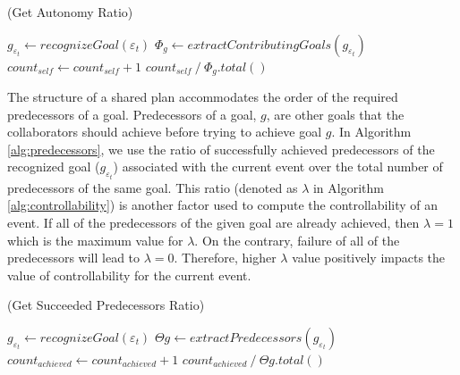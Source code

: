 \documentclass{aamas2016}
\begin{document}
\begin{algorithm}
	\caption{(Get Autonomy Ratio)}
	\label{alg:autonomy}
	\begin{algorithmic}[1]
			\Statex
			\State $\mathit{g}_{\varepsilon_t} \gets \textit{recognizeGoal}{(\varepsilon_t)}$
			\Statex
				\State {}
			\EndIf
			\Statex
			\State $\Phi_{\mathit{g}} \gets
			\textit{extractContributingGoals}{(\mathit{g}_{\varepsilon_t})}$
			\Statex
					\State $count_{self} \gets count_{self} + 1$
				\EndIf
			\EndFor
			\Statex
			\State \Return 
			${count_{self} \mathbin{/} {{\Phi_{\mathit{g}}}.total()}}$
		\EndFunction 
	\end{algorithmic}
\end{algorithm}

The structure of a shared plan accommodates the order of the required
predecessors of a goal. Predecessors of a goal, $g$, are other goals that
the collaborators should achieve before trying to achieve goal $g$. In Algorithm
\ref{alg:predecessors}, we use the ratio of successfully achieved predecessors
of the recognized goal ($\mathit{g}_{\varepsilon_t}$) associated with the
current event over the total number of predecessors of the same goal. This ratio
(denoted as $\lambda$ in Algorithm \ref{alg:controllability}) is another factor
used to compute the controllability of an event. If all of the predecessors of
the given goal are already achieved, then $\lambda=1$ which is the maximum value
for $\lambda$. On the contrary, failure of all of the predecessors will lead to
$\lambda=0$. Therefore, higher $\lambda$ value positively impacts the value of
controllability for the current event.

\renewcommand\thealgorithm{4\alph{algorithm}}
\setcounter{algorithm}{2}

\begin{algorithm}
	\caption{(Get Succeeded Predecessors Ratio)}
	\label{alg:predecessors}
	\begin{algorithmic}[1]
			\Statex
			\State $\mathit{g}_{\varepsilon_t} \gets
			\textit{recognizeGoal}{(\varepsilon_t)}$
			\Statex
				\State {}
			\EndIf
			\Statex
			\State $\Theta{\mathit{g}} \gets
			\textit{extractPredecessors}{(\mathit{g}_{\varepsilon_t})}$
			\Statex
					\State $count_{achieved} \gets count_{achieved} + 1$
				\EndIf
			\EndFor
			\Statex
			\State \Return
			${count_{achieved} \mathbin{/} {\Theta{\mathit{g}}.total()}}$
		\EndFunction 
	\end{algorithmic}
\end{algorithm}
\end{document}
